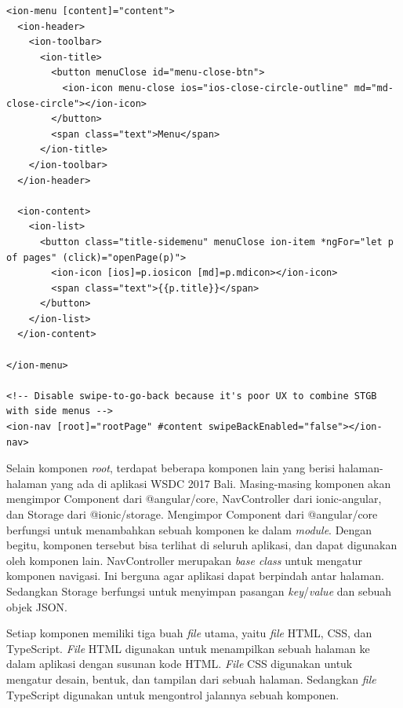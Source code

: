 \begin{lstlisting}[label={lst:apphtml}, caption=\textit{Source Code} File app.html]
<ion-menu [content]="content">
  <ion-header>
    <ion-toolbar>
      <ion-title>
        <button menuClose id="menu-close-btn">
          <ion-icon menu-close ios="ios-close-circle-outline" md="md-close-circle"></ion-icon>
        </button>
        <span class="text">Menu</span>
      </ion-title>
    </ion-toolbar>
  </ion-header>

  <ion-content>
    <ion-list>
      <button class="title-sidemenu" menuClose ion-item *ngFor="let p of pages" (click)="openPage(p)">
        <ion-icon [ios]=p.iosicon [md]=p.mdicon></ion-icon>
        <span class="text">{{p.title}}</span>
      </button>
    </ion-list>
  </ion-content>

</ion-menu>

<!-- Disable swipe-to-go-back because it's poor UX to combine STGB with side menus -->
<ion-nav [root]="rootPage" #content swipeBackEnabled="false"></ion-nav>

\end{lstlisting} 
\newpage
Selain komponen \textit{root}, terdapat beberapa komponen lain yang berisi halaman-halaman yang ada di aplikasi WSDC 2017 Bali. Masing-masing komponen akan mengimpor Component dari @angular/core, NavController dari ionic-angular, dan Storage dari @ionic/storage. Mengimpor Component dari @angular/core berfungsi untuk menambahkan sebuah komponen ke dalam \textit{module}. Dengan begitu, komponen tersebut bisa terlihat di seluruh aplikasi, dan dapat digunakan oleh komponen lain. NavController merupakan \textit{base class} untuk mengatur komponen navigasi. Ini berguna agar aplikasi dapat berpindah antar halaman. Sedangkan Storage berfungsi untuk menyimpan pasangan \textit{key}/\textit{value} dan sebuah objek JSON.

Setiap komponen memiliki tiga buah \textit{file} utama, yaitu \textit{file} HTML, CSS, dan TypeScript. \textit{File} HTML digunakan untuk menampilkan sebuah halaman ke dalam aplikasi dengan susunan kode HTML. \textit{File} CSS digunakan untuk mengatur desain, bentuk, dan tampilan dari sebuah halaman. Sedangkan \textit{file} TypeScript digunakan untuk mengontrol jalannya sebuah komponen.

